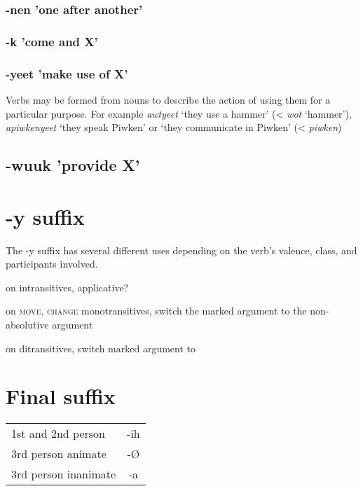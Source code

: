 \documentclass[smallroyalvopaper,9pt]{memoir} %
\begin{document}
\subsubsection{-nen 'one after another'}

\subsubsection{-k 'come and X'}

\subsubsection{-yeet 'make use of X'}

Verbs may be formed from nouns to describe the action of using them for a particular purpose. For example \textit{awtyeet} `they use a hammer' (< \textit{wot} `hammer'), \textit{apiwkenyeet} `they speak Piwken' or `they communicate in Piwken' (< \textit{piwken}) 

\subsection{-wuuk 'provide X'}

\section{-y suffix}

The -y suffix has several different uses depending on the verb's valence, class, and participants involved.

on intransitives, applicative?

on \textsc{move, change} monotransitives, switch the marked argument to the non-absolutive argument

on ditransitives, switch marked argument to 

\section{Final suffix}

\begin{table}[ht]
    \centering
    \begin{tabular}{lc}
        \toprule
        1st and 2nd person & -ih \\
        3rd person animate & -Ø \\
        3rd person inanimate & -a \\
        \bottomrule
    \end{tabular}
\end{table}
\end{document}

